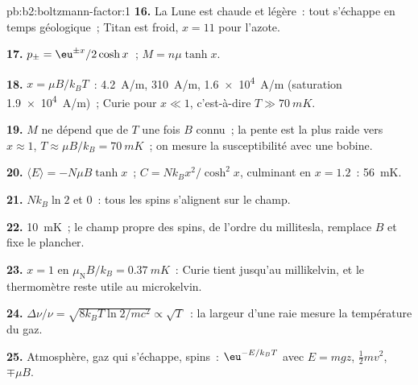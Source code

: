\begin{solution}{pb:b2:boltzmann-factor:1}
\textbf{16.} La Lune est chaude et légère~: tout s'échappe en
temps géologique~; Titan est froid, $x = 11$ pour l'azote.

\textbf{17.} $p_\pm = \eu^{\pm x}/2\cosh x$~; $M = n\mu\tanh x$.

\textbf{18.} $x = \mu B/k_BT$~: \qty{4.2}{A/m}, \qty{310}{A/m}, \qty{1.6e4}{A/m}
(saturation \qty{1.9e4}{A/m})~; Curie pour $x \ll 1$, c'est-à-dire $T \gg \qty{70}{mK}$.

\textbf{19.} $M$ ne dépend que de $T$ une fois $B$ connu~; la pente est la plus raide vers
$x \approx 1$, $T \approx \mu B/k_B = \qty{70}{mK}$~; on mesure la
susceptibilité avec une bobine.

\textbf{20.} $\langle E\rangle = -N\mu B\tanh x$~; $C = Nk_Bx^2/\cosh^2x$, culminant en
$x = 1.2$~: \qty{56}{mK}.

\textbf{21.} $Nk_B\ln 2$ et $0$~: tous les spins s'alignent sur le champ.

\textbf{22.} \qty{10}{mK}~; le champ propre des spins, de l'ordre du millitesla, remplace $B$
et fixe le plancher.

\textbf{23.} $x = 1$ en $\mu_{\text{N}}B/k_B = \qty{0.37}{mK}$~: Curie tient jusqu'au
millikelvin, et le thermomètre reste utile au microkelvin.

\textbf{24.} $\Delta\nu/\nu = \sqrt{8k_BT\ln2/mc^2} \propto \sqrt T$~: la largeur
d'une raie mesure la température du gaz.

\textbf{25.} Atmosphère, gaz qui s'échappe, spins~: $\eu^{-E/k_BT}$ avec $E = mgz$,
$\tfrac12mv^2$, $\mp\mu B$.
\end{solution}
